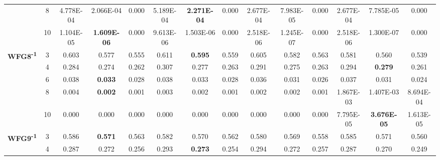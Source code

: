 \documentclass[onecolumn,10pt]{asme2ej}
\begin{document}
\begin{table}[!htb]
\begin{tabular}{|c|c|c|c|c|c|c|c|c|c|c|c|c|c|}
	& 8          & 4.778E-04     & 2.066E-04          & 0.000          & 5.189E-04     & \textbf{2.271E-04} & 0.000          & 2.677E-04     & 7.983E-05          & 0.000          & 2.677E-04     & 7.785E-05          & 0.000          \\ \cline{2-14} 
	& 10         & 1.104E-05     & \textbf{1.609E-06} & 0.000          & 9.613E-06     & 1.503E-06          & 0.000          & 2.518E-06     & 1.245E-07          & 0.000          & 2.518E-06     & 1.300E-07          & 0.000          \\ \hline
	\multirow{5}{*}{\textbf{WFG8\textsuperscript{-1}}} & 3          & 0.603         & 0.577              & 0.555          & 0.611         & \textbf{0.595}     & 0.559          & 0.605         & 0.582              & 0.563          & 0.581         & 0.560              & 0.539          \\ \cline{2-14} 
	& 4          & 0.284         & 0.274              & 0.262          & 0.307         & 0.277              & 0.263          & 0.291         & 0.275              & 0.263          & 0.294         & \textbf{0.279}     & 0.261          \\ \cline{2-14} 
	& 6          & 0.038         & \textbf{0.033}     & 0.028          & 0.038         & 0.033              & 0.028          & 0.036         & 0.031              & 0.026          & 0.037         & 0.031              & 0.024          \\ \cline{2-14} 
	& 8          & 0.004         & \textbf{0.002}     & 0.001          & 0.003         & 0.002              & 0.001          & 0.002         & 0.002              & 0.001          & 1.867E-03     & 1.407E-03          & 8.694E-04      \\ \cline{2-14} 
	& 10         & 0.000         & 0.000              & 0.000          & 0.000         & 0.000              & 0.000          & 0.000         & 0.000              & 0.000          & 7.795E-05     & \textbf{3.676E-05} & 1.613E-05      \\ \hline
	\multirow{5}{*}{\textbf{WFG9\textsuperscript{-1}}} & 3          & 0.586         & \textbf{0.571}     & 0.563          & 0.582         & 0.570              & 0.562          & 0.580         & 0.569              & 0.558          & 0.585         & 0.571              & 0.560          \\ \cline{2-14} 
	& 4          & 0.287         & 0.272              & 0.256          & 0.293         & \textbf{0.273}     & 0.254          & 0.294         & 0.272              & 0.257          & 0.287         & 0.270              & 0.249          \\ \cline{2-14} 

\end{tabular}
\end{table}
\end{document}
